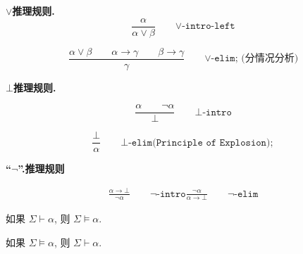     \textbf{$\lor$推理规则.}
    \[
    \frac{\alpha}{\alpha \lor \beta}\qquad {\lor\texttt{-intro-left}}
    \]

    \[
    \frac{\alpha \lor \beta \qquad \alpha \to \gamma \qquad \beta \to \gamma}{\gamma}\qquad {\lor\texttt{-elim; (分情况分析)}}
    \]

    \textbf{$\bot$推理规则.}

    \[
    \frac{\alpha \qquad \lnot \alpha}{\bot}\qquad {\bot\texttt{-intro}}
  \]

  \[
    \frac{\bot}{\alpha}\qquad {\bot\texttt{-elim(Principle of Explosion)}; }
  \]

  \textbf{``$\lnot$''.推理规则}

  \begin{gather*}
    \frac{\alpha \to \bot}{\lnot \alpha}\qquad {\lnot\texttt{-intro}} 
    \frac{\lnot \alpha}{\alpha \to \bot}\qquad {\lnot\texttt{-elim}}
  \end{gather*}

  \begin{theorem}
    如果 $\Sigma \vdash \alpha$, 则 $\Sigma \models \alpha$. 
  \end{theorem}

  \begin{theorem}
    如果 $\Sigma \models \alpha$, 则 $\Sigma \vdash \alpha$. 
  \end{theorem}
  